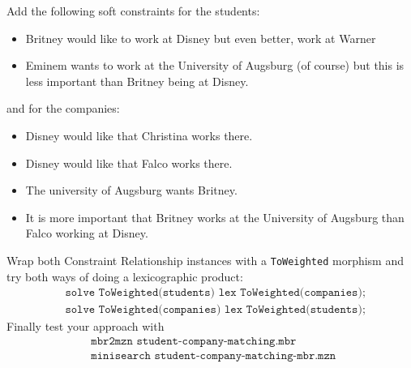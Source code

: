 \documentclass[a4paper,10pt,fleqn]{article}
\begin{document}
Add the following soft constraints for the students: 
\begin{itemize}
\item Britney would like to work at Disney but even better, work at Warner
\item Eminem wants to work at the University of Augsburg (of course) but this is less important than Britney being at Disney.
\end{itemize}
and for the companies:
\begin{itemize}
\item Disney would like that Christina works there.
\item Disney would like that Falco works there.
\item The university of Augsburg wants Britney.
\item It is more important that Britney works at the University of Augsburg than Falco working at Disney.
\end{itemize}
Wrap both Constraint Relationship instances with a \texttt{ToWeighted} morphism and try both ways of doing a lexicographic product:
\begin{align*}
&\texttt{solve ToWeighted(students) lex ToWeighted(companies);} \\
&\texttt{solve ToWeighted(companies) lex ToWeighted(students);}
\end{align*}
Finally test your approach with 
\begin{align*}
&\texttt{mbr2mzn student-company-matching.mbr } \\
&\texttt{minisearch student-company-matching-mbr.mzn } \\
\end{align*}
\end{document}
